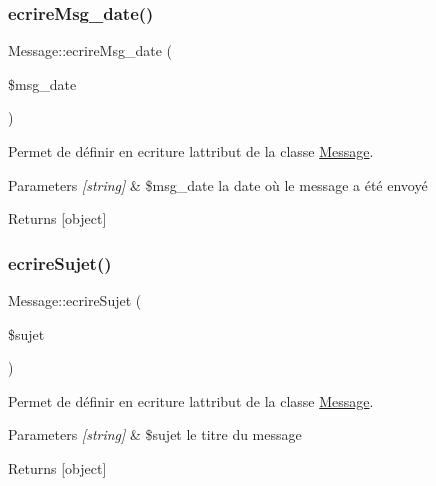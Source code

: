 \subsubsection{\texorpdfstring{ecrire\+Msg\+\_\+date()}{ecrireMsg\_date()}}
{\footnotesize\ttfamily Message\+::ecrire\+Msg\+\_\+date (\begin{DoxyParamCaption}\item[{}]{\$msg\+\_\+date }\end{DoxyParamCaption})}



Permet de définir en ecriture l\textquotesingle{}attribut de la classe \hyperlink{class_message}{Message}. 


\begin{DoxyParams}{Parameters}
{\em \mbox{[}string\mbox{]}} & \$msg\+\_\+date la date où le message a été envoyé \\
\hline
\end{DoxyParams}
\begin{DoxyReturn}{Returns}
\mbox{[}object\mbox{]} 
\end{DoxyReturn}
\mbox{\label{class_message_a1d5c9c4bbf0796264cc0fac911d65f3b}} 
\subsubsection{\texorpdfstring{ecrire\+Sujet()}{ecrireSujet()}}
{\footnotesize\ttfamily Message\+::ecrire\+Sujet (\begin{DoxyParamCaption}\item[{}]{\$sujet }\end{DoxyParamCaption})}



Permet de définir en ecriture l\textquotesingle{}attribut de la classe \hyperlink{class_message}{Message}. 


\begin{DoxyParams}{Parameters}
{\em \mbox{[}string\mbox{]}} & \$sujet le titre du message \\
\hline
\end{DoxyParams}
\begin{DoxyReturn}{Returns}
\mbox{[}object\mbox{]} 
\end{DoxyReturn}
\mbox{\label{class_message_a3d577d3c28a1e766278db62f7ad78818}} 
